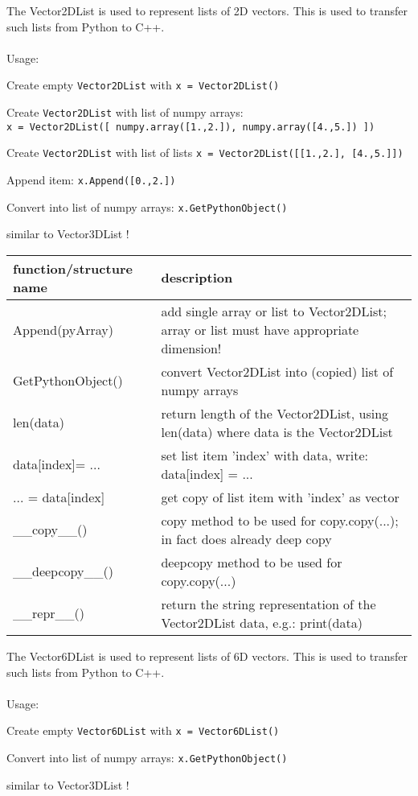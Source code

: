 The Vector2DList is used to represent lists of 2D vectors. This is used to transfer such lists from Python to C++. \\ \\ Usage: \bi
  \item Create empty \texttt{Vector2DList} with \texttt{x = Vector2DList()} 
  \item Create \texttt{Vector2DList} with list of numpy arrays:\\\texttt{x = Vector2DList([ numpy.array([1.,2.]), numpy.array([4.,5.]) ])}
  \item Create \texttt{Vector2DList} with list of lists \texttt{x = Vector2DList([[1.,2.], [4.,5.]])}
  \item Append item: \texttt{x.Append([0.,2.])}
  \item Convert into list of numpy arrays: \texttt{x.GetPythonObject()}
  \item similar to Vector3DList !
\ei


\begin{center}
\footnotesize
\begin{longtable}{| p{8cm} | p{8cm} |} 
\hline
{\bf function/structure name} & {\bf description}\\ \hline
  Append(pyArray) & add single array or list to Vector2DList; array or list must have appropriate dimension!\\ \hline 
  GetPythonObject() & convert Vector2DList into (copied) list of numpy arrays\\ \hline 
  len(data) & return length of the Vector2DList, using len(data) where data is the Vector2DList\\ \hline 
  data[index]= ... & set list item 'index' with data, write: data[index] = ...\\ \hline 
  ... = data[index] & get copy of list item with 'index' as vector\\ \hline 
  \_\_copy\_\_() & copy method to be used for copy.copy(...); in fact does already deep copy\\ \hline 
  \_\_deepcopy\_\_() & deepcopy method to be used for copy.copy(...)\\ \hline 
  \_\_repr\_\_() & return the string representation of the Vector2DList data, e.g.: print(data)\\ \hline 
\end{longtable}
\end{center}

The Vector6DList is used to represent lists of 6D vectors. This is used to transfer such lists from Python to C++. \\ \\ Usage: \bi
  \item Create empty \texttt{Vector6DList} with \texttt{x = Vector6DList()} 
  \item Convert into list of numpy arrays: \texttt{x.GetPythonObject()}
  \item similar to Vector3DList !
\ei


